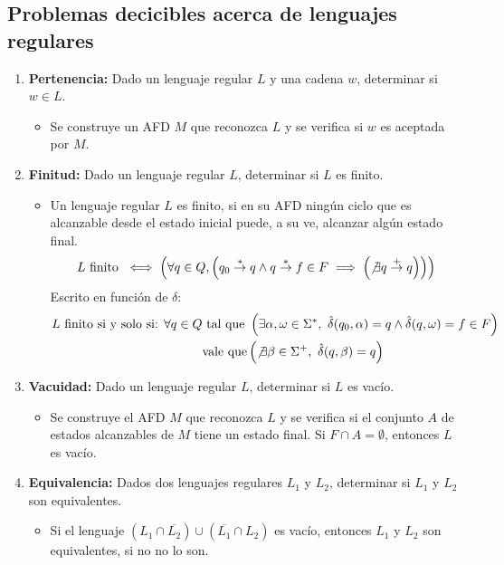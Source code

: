 \subsection{Problemas decicibles acerca de lenguajes regulares}
\begin{enumerate}
  \item \textbf{Pertenencia:} Dado un lenguaje regular \(L\) y una cadena \(w\), determinar si \(w\in L\).
        \begin{itemize}
          \item[] Se construye un AFD \(M\) que reconozca \(L\) y se verifica si \(w\) es aceptada por \(M\).
        \end{itemize}
  \item \textbf{Finitud:} Dado un lenguaje regular \(L\), determinar si \(L\) es finito.
        \begin{itemize}
          \item[] Un lenguaje regular \(L\) es finito, si en su AFD ningún ciclo que es alcanzable desde el estado inicial puede, a su ve, alcanzar algún estado final.
            \[
              L \text{ finito } \iff \left(
              \forall q \in Q,\left(
                q_0 \overset{*}{\rightarrow} q \land q \overset{*}{\rightarrow} f \in F \implies \left(\not\exists q\overset{+}{\rightarrow} q\right)
                \right)
              \right)\]
            Escrito en función de \(\delta\):
            \begin{align*}
              L \text{ finito si y solo si: } \forall q \in Q & \text{ tal que } \left(
              \exists\alpha,\omega\in\Sigma^*,~\hat\delta(q_0, \alpha) = q \land \hat\delta(q, \omega) = f \in F
              \right)                                                                   \\ &\text{vale que} \left(\not\exists\beta\in\Sigma^+,~\hat\delta(q, \beta) = q\right)
            \end{align*}
        \end{itemize}
  \item \textbf{Vacuidad:} Dado un lenguaje regular \(L\), determinar si \(L\) es vacío.
        \begin{itemize}
          \item[] Se construye el AFD \(M\) que reconozca \(L\) y se verifica si el conjunto \(A\) de estados alcanzables de \(M\) tiene un estado final. Si \(F\cap A = \emptyset\), entonces \(L\) es vacío.
        \end{itemize}
  \item \textbf{Equivalencia:} Dados dos lenguajes regulares \(L_1\) y \(L_2\), determinar si \(L_1\) y \(L_2\) son equivalentes.
        \begin{itemize}
          \item[] Si el lenguaje \( (L_1 \cap \overline{L_2}) \cup (\overline{L_1}\cap L_2) \) es vacío, entonces \(L_1\) y \(L_2\) son equivalentes, si no no lo son.
        \end{itemize}
\end{enumerate}
